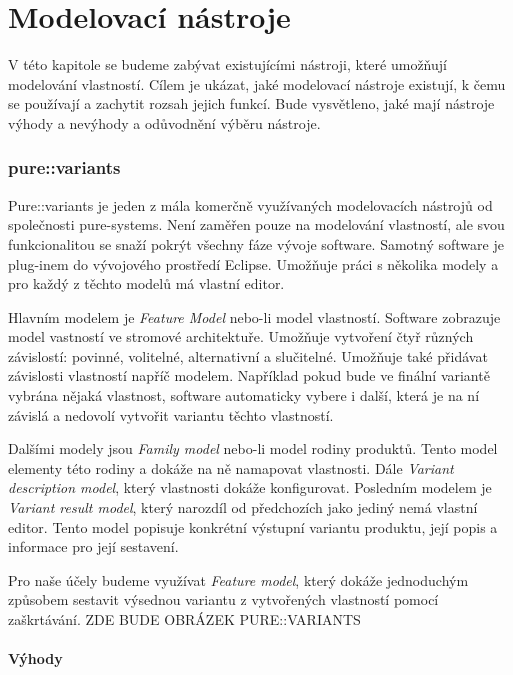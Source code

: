 \chapter{Modelovací nástroje}

V této kapitole se budeme zabývat existujícími nástroji, které umožňují modelování vlastností. Cílem je ukázat, jaké modelovací nástroje existují, k čemu se používají a zachytit rozsah jejich funkcí. Bude vysvětleno, jaké mají nástroje výhody a nevýhody a odůvodnění výběru nástroje.

\subsection{pure::variants}

Pure::variants je jeden z mála komerčně využívaných modelovacích nástrojů od společnosti pure-systems. Není zaměřen pouze na modelování vlastností, ale svou funkcionalitou se snaží pokrýt všechny fáze vývoje software. Samotný software je plug-inem do vývojového prostředí Eclipse. Umožňuje práci s několika modely a pro každý z těchto modelů má vlastní editor.

Hlavním modelem je \textit{Feature Model} nebo-li model vlastností. Software zobrazuje model vastností ve stromové architektuře. Umožňuje vytvoření čtyř různých závislostí: povinné, volitelné, alternativní a slučitelné. Umožňuje také přidávat závislosti vlastností napříč modelem. Například pokud bude ve finální variantě vybrána nějaká vlastnost, software automaticky vybere i další, která je na ní závislá a nedovolí vytvořit variantu těchto vlastností. 

Dalšími modely jsou \textit{Family model} nebo-li model rodiny produktů. Tento model elementy této rodiny a dokáže na ně namapovat vlastnosti. Dále \textit{Variant description model}, který vlastnosti dokáže konfigurovat. Posledním modelem je \textit{Variant result model}, který narozdíl od předchozích jako jediný nemá vlastní editor. Tento model popisuje konkrétní výstupní variantu produktu, její popis a informace pro její sestavení.

Pro naše účely budeme využívat \textit{Feature model}, který dokáže jednoduchým způsobem sestavit výsednou variantu z vytvořených vlastností pomocí zaškrtávání. 
\newline
\newline
ZDE BUDE OBRÁZEK PURE::VARIANTS
\newline
\newline

\subsubsection{Výhody}

